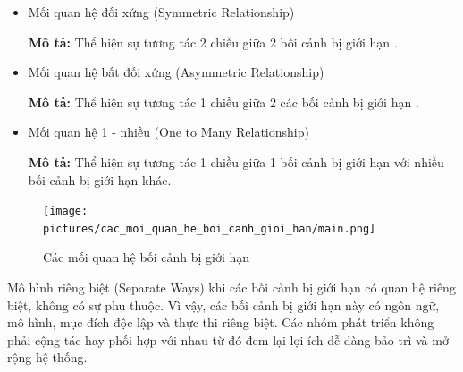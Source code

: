 \begin{itemize}

\item Mối quan hệ đối xứng (Symmetric Relationship)

\textbf{Mô tả:} Thể hiện sự tương tác 2 chiều giữa 2 bối cảnh bị giới hạn .

\item Mối quan hệ bất đối xứng (Asymmetric Relationship)

\textbf{Mô tả:} Thể hiện sự tương tác 1 chiều giữa 2 các bối cảnh bị giới hạn .

\item Mối quan hệ 1 - nhiều (One to Many Relationship)

\textbf{Mô tả:} Thể hiện sự tương tác 1 chiều giữa 1 bối cảnh bị giới hạn với nhiều bối cảnh bị giới hạn khác.

\end{itemize}

\begin{figure}[H]

\centering

\texttt{[image: pictures/cac\_moi\_quan\_he\_boi\_canh\_gioi\_han/main.png]}

\caption{Các mối quan hệ bối cảnh bị giới hạn}

\end{figure}












Mô hình riêng biệt (Separate Ways) khi các bối cảnh bị giới hạn có quan hệ riêng biệt, không có sự phụ thuộc. Vì vậy, các bối cảnh bị giới hạn này có ngôn ngữ, mô hình, mục đích độc lập và thực thi riêng biệt. Các nhóm phát triển không phải cộng tác hay phối hợp với nhau từ đó đem lại lợi ích dễ dàng bảo trì và mở rộng hệ thống.

